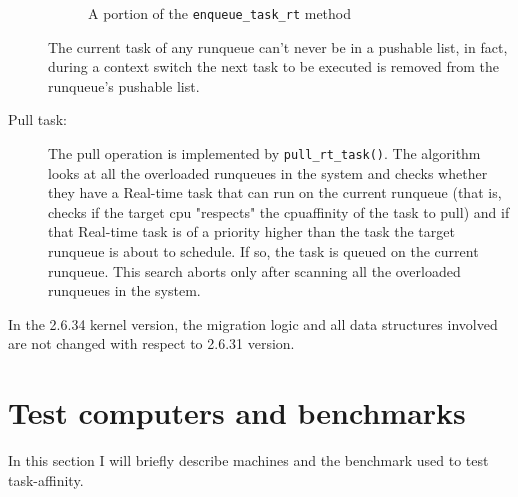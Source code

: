 \begin{description}
\begin{figure}[h]
  \lstset{basicstyle=\footnotesize, language=c, captionpos=b, frame=single, label=lis:steps}
  
  \label{code:ttwu}
  \caption{A portion of the \texttt{enqueue\_task\_rt} method}
\end{figure}

The current task of any runqueue can't never be in a pushable list, in fact, during a context switch the next task to be executed is removed from the 
runqueue's pushable list.

\item[Pull task:] The pull operation is implemented by \texttt{pull\_rt\_task()}. The algorithm looks at all the overloaded runqueues in the system 
and checks whether they have a Real-time task that can run on the current runqueue (that is, checks if the target cpu "respects" the cpuaffinity of 
the task to pull) and if that Real-time task is of a priority higher than the task the target runqueue is about to schedule. If so, the task is 
queued on the current runqueue. This search aborts only after scanning all the overloaded runqueues in the system. 

\end{description}

In the 2.6.34 kernel version, the migration logic and all data structures involved are not changed with respect to 2.6.31 version.

\section{Test computers and benchmarks}

In this section I will briefly describe machines and the benchmark used to test task-affinity.

